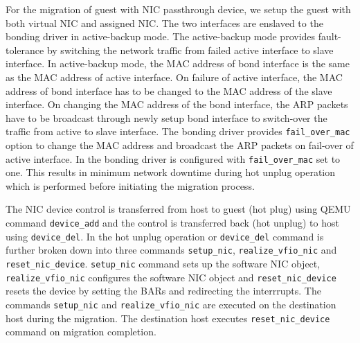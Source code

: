 

For the migration of guest with NIC passthrough device, we setup the 
guest with both virtual NIC and assigned NIC. The two interfaces 
are enslaved to the bonding driver in active-backup mode. The 
active-backup mode provides fault-tolerance by switching the
network traffic from failed active interface to slave interface.
In active-backup mode, the MAC address of bond interface 
is the same as the MAC address of active interface. On failure 
of active interface, the MAC address of bond interface has to 
be changed to the MAC address of the slave interface. On changing
the MAC address of the bond interface, the ARP packets have to be
broadcast through newly setup bond interface to switch-over the
traffic from active to slave interface. The bonding driver 
provides \texttt{fail\_over\_mac} option to change 
the MAC address and broadcast the ARP packets on fail-over of
active interface. In \na the bonding driver is configured 
with \texttt{fail\_over\_mac} set to one. This results in minimum
network downtime during hot unplug operation which is performed
before initiating the migration process.

The NIC device control is transferred from host to guest 
(hot plug) using QEMU command \texttt{device\_add} 
and the control is transferred back (hot unplug) to host 
using \texttt{device\_del}. In \na the hot unplug operation 
or \texttt{device\_del} command is further broken down 
into three commands \texttt{setup\_nic}, 
\texttt{realize\_vfio\_nic} and \texttt{reset\_nic\_device}.
\texttt{setup\_nic} command sets up the software NIC object, 
\texttt{realize\_vfio\_nic} configures the software NIC object
and \texttt{reset\_nic\_device} resets the device by setting the 
BARs and redirecting the interrrupts. The commands \texttt{setup\_nic}
and \texttt{realize\_vfio\_nic} are executed on the destination host
during the migration. The destination host executes 
\texttt{reset\_nic\_device} command on migration completion.    
